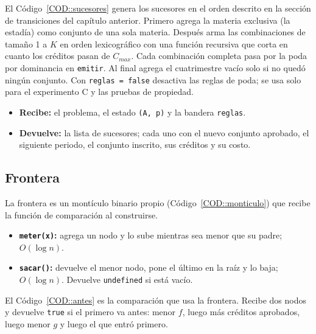 El Código~\ref{COD::sucesores} genera los sucesores en el orden descrito en la sección de transiciones del capítulo anterior. Primero agrega la materia exclusiva (la estadía) como conjunto de una sola materia. Después arma las combinaciones de tamaño 1 a $K$ en orden lexicográfico con una función recursiva que corta en cuanto los créditos pasan de $C_{max}$. Cada combinación completa pasa por la poda por dominancia en \texttt{emitir}. Al final agrega el cuatrimestre vacío solo si no quedó ningún conjunto. Con \texttt{reglas = false} desactiva las reglas de poda; se usa solo para el experimento C y las pruebas de propiedad.
\begin{itemize}
    \item \textbf{Recibe:} el problema, el estado \texttt{(A, p)} y la bandera \texttt{reglas}.
    \item \textbf{Devuelve:} la lista de sucesores; cada uno con el nuevo conjunto aprobado, el siguiente periodo, el conjunto inscrito, sus créditos y su costo.
\end{itemize}


\subsection{Frontera}
La frontera es un montículo binario propio (Código~\ref{COD::monticulo}) que recibe la función de comparación al construirse.
\begin{itemize}
    \item \textbf{\texttt{meter(x)}:} agrega un nodo y lo sube mientras sea menor que su padre; $O(\log n)$.
    \item \textbf{\texttt{sacar()}:} devuelve el menor nodo, pone el último en la raíz y lo baja; $O(\log n)$. Devuelve \texttt{undefined} si está vacío.
\end{itemize}


El Código~\ref{COD::antes} es la comparación que usa la frontera. Recibe dos nodos y devuelve \texttt{true} si el primero va antes: menor $f$, luego más créditos aprobados, luego menor $g$ y luego el que entró primero.


